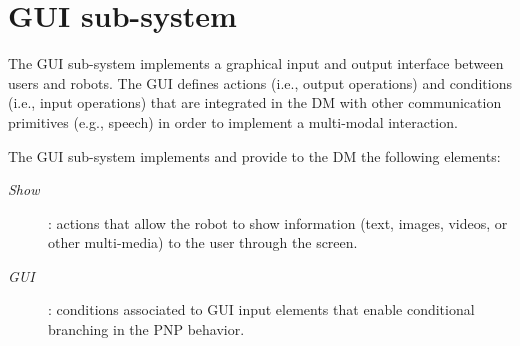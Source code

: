 \section{GUI sub-system}

The GUI sub-system implements a graphical input and output interface between users and robots. The GUI defines actions (i.e., output operations) and conditions (i.e., input operations) that are integrated in the DM with other communication primitives (e.g., speech) in order to implement a multi-modal interaction.



The GUI sub-system implements and provide to the DM the following elements:

\begin{description}
\item[\emph{Show}]: actions that allow the robot to show information (text, images, videos, or other multi-media) to the user through the screen.
\item[\emph{GUI}]: conditions associated to GUI input elements that enable conditional branching in the PNP behavior.
\end{description}




